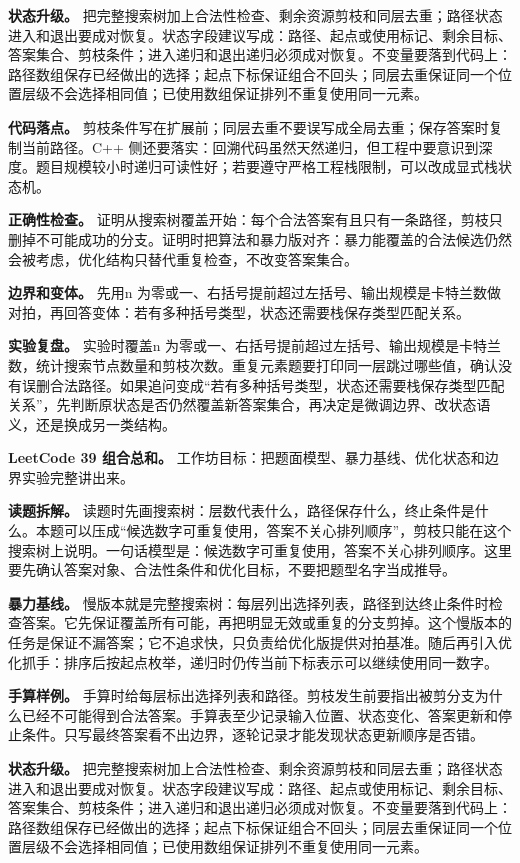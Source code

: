 \textbf{状态升级。} 把完整搜索树加上合法性检查、剩余资源剪枝和同层去重；路径状态进入和退出要成对恢复。状态字段建议写成：路径、起点或使用标记、剩余目标、答案集合、剪枝条件；进入递归和退出递归必须成对恢复。不变量要落到代码上：路径数组保存已经做出的选择；起点下标保证组合不回头；同层去重保证同一个位置层级不会选择相同值；已使用数组保证排列不重复使用同一元素。

\textbf{代码落点。} 剪枝条件写在扩展前；同层去重不要误写成全局去重；保存答案时复制当前路径。C++ 侧还要落实：回溯代码虽然天然递归，但工程中要意识到深度。题目规模较小时递归可读性好；若要遵守严格工程栈限制，可以改成显式栈状态机。

\textbf{正确性检查。} 证明从搜索树覆盖开始：每个合法答案有且只有一条路径，剪枝只删掉不可能成功的分支。证明时把算法和暴力版对齐：暴力能覆盖的合法候选仍然会被考虑，优化结构只替代重复检查，不改变答案集合。

\textbf{边界和变体。} 先用n 为零或一、右括号提前超过左括号、输出规模是卡特兰数做对拍，再回答变体：若有多种括号类型，状态还需要栈保存类型匹配关系。

\textbf{实验复盘。} 实验时覆盖n 为零或一、右括号提前超过左括号、输出规模是卡特兰数，统计搜索节点数量和剪枝次数。重复元素题要打印同一层跳过哪些值，确认没有误删合法路径。如果追问变成“若有多种括号类型，状态还需要栈保存类型匹配关系”，先判断原状态是否仍然覆盖新答案集合，再决定是微调边界、改状态语义，还是换成另一类结构。

\noindent\textbf{LeetCode 39 组合总和。} 工作坊目标：把题面模型、暴力基线、优化状态和边界实验完整讲出来。

\textbf{读题拆解。} 读题时先画搜索树：层数代表什么，路径保存什么，终止条件是什么。本题可以压成“候选数字可重复使用，答案不关心排列顺序”，剪枝只能在这个搜索树上说明。一句话模型是：候选数字可重复使用，答案不关心排列顺序。这里要先确认答案对象、合法性条件和优化目标，不要把题型名字当成推导。

\textbf{暴力基线。} 慢版本就是完整搜索树：每层列出选择列表，路径到达终止条件时检查答案。它先保证覆盖所有可能，再把明显无效或重复的分支剪掉。这个慢版本的任务是保证不漏答案；它不追求快，只负责给优化版提供对拍基准。随后再引入优化抓手：排序后按起点枚举，递归时仍传当前下标表示可以继续使用同一数字。

\textbf{手算样例。} 手算时给每层标出选择列表和路径。剪枝发生前要指出被剪分支为什么已经不可能得到合法答案。手算表至少记录输入位置、状态变化、答案更新和停止条件。只写最终答案看不出边界，逐轮记录才能发现状态更新顺序是否错。

\textbf{状态升级。} 把完整搜索树加上合法性检查、剩余资源剪枝和同层去重；路径状态进入和退出要成对恢复。状态字段建议写成：路径、起点或使用标记、剩余目标、答案集合、剪枝条件；进入递归和退出递归必须成对恢复。不变量要落到代码上：路径数组保存已经做出的选择；起点下标保证组合不回头；同层去重保证同一个位置层级不会选择相同值；已使用数组保证排列不重复使用同一元素。

